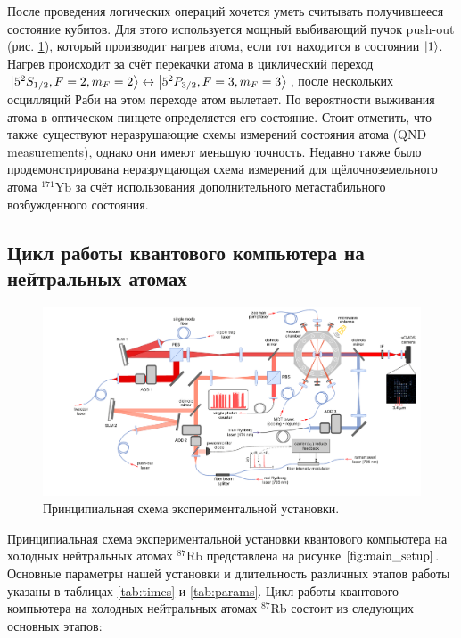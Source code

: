 После проведения логических операций хочется уметь считывать получившееся состояние кубитов. Для этого используется мощный выбивающий пучок push-out (рис. \ref{fig:main_setup}), который производит нагрев атома, если тот находится в состоянии $\left| 1 \right\rangle$. Нагрев происходит за счёт перекачки атома в циклический переход $\left| 5^2S_{1/2},F=2,m_F=2 \right\rangle\leftrightarrow\left| 5^2P_{3/2},F=3,m_F=3 \right\rangle$, после нескольких осцилляций Раби на этом переходе атом вылетает. По вероятности выживания атома в оптическом пинцете определяется его состояние. Стоит отметить, что также существуют неразрушающие схемы измерений состояния атома \cite{QND} (QND measurements), однако они имеют меньшую точность. Недавно также было продемонстрирована неразрущающая схема измерений для щёлочноземельного атома $^{171}\text{Yb}$ \cite{Ma:2023aa} за счёт использования дополнительного метастабильного возбужденного состояния.

\subsection{Цикл работы квантового компьютера на нейтральных атомах}



\begin{figure}[ht]
	\centering
	\includegraphics[width=1.0\textwidth]{images/Main_setup_vs_Raman_EN.pdf}
	\caption{Принципиальная схема экспериментальной установки.}
	\label{fig:main_setup}
\end{figure}

Принципиальная схема экспериментальной установки квантового компьютера на холодных нейтральных атомах $^{87}\text{Rb}$ представлена на рисунке $\ref{fig:main_setup}$. Основные параметры нашей установки и длительность различных этапов работы указаны в таблицах \ref{tab:times} и \ref{tab:params}. Цикл работы квантового компьютера на холодных нейтральных атомах $^{87}\text{Rb}$ состоит из следующих основных этапов:

